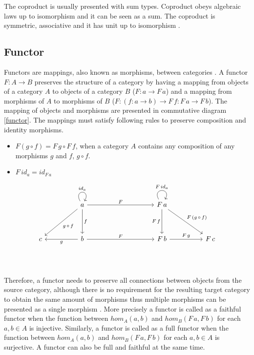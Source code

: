 \documentclass[article]{aaltoseries}
\begin{document}
    The coproduct is usually presented with sum types. Coproduct obeys algebraic
    laws up to isomorphism and it can be seen as a sum. The coproduct is
    symmetric, associative and it has unit up to isomorphism \cite{barr1990category}.
    

  \subsection{Functor}
    Functors are mappings, also known as morphisms, between categories
    \cite{barr1990category, mac2013categories, computational}. A functor $F: A
    \rightarrow B$ preserves the structure of a category by having a mapping
    from objects of a category $A$ to objects of a category $B$ ($F: a
    \rightarrow F\, a$) and a mapping from morphisms of $A$ to morphisms of $B$
    ($F: (f: a \rightarrow b) \rightarrow F\, f: F\, a \rightarrow F\, b$). The
    mapping of objects and morphisms are presented in commutative diagram
    \ref{functor}. The mappings must satisfy following rules to preserve
    composition and identity morphisms.

    \begin{itemize}
      \item $F(g \circ f) = F\, g \circ F\, f$, when a category $A$ contains any
        composition of any morphisms $g$ and $f$, $g \circ f$.
      \item $F\, id_a = id_{F\, a}$
    \end{itemize}

    \begin{equation}
      \label{functor}
      \begin{tikzcd}[row sep=huge, column sep=huge]
        & a \arrow[d, "f"] \arrow[dl, "g\, \circ\, f"] \arrow[r, "F"] \arrow[loop, distance=2em, in=60, out=120, "id_a"]
        &[5em] F\, a \arrow[d, "F\, f"'] \arrow[dr, "F\, (g\, \circ\, f)"]
                   \arrow[loop, distance=2em, in=60, out=120, "F\, id_a"]
        & \\
        c
        & b \arrow[l, "g"] \arrow[r, "F"]
        & F\, b \arrow[r, "F\, g"]
        & F\, c \\
      \end{tikzcd}
    \end{equation}

    Therefore, a functor needs to preserve all connections between objects from
    the source category, although there is no requirement for the resulting
    target category to obtain the same amount of morphisms thus multiple
    morphisms can be presented as a single morphism \cite{barr1990category,
      computational}. More precisely a functor is called as a faithful
    functor when the function between $hom_A(a, b)$ and $hom_B(F\, a, F\, b)$ for
    each $a, b \in A$ is injective. Similarly, a functor is called as a full
    functor when the function between $hom_A(a, b)$ and $hom_B(F\, a, F\, b)$ for
    each $a, b \in A$ is surjective. A functor can also be full and faithful at
    the same time.
 
\end{document}

